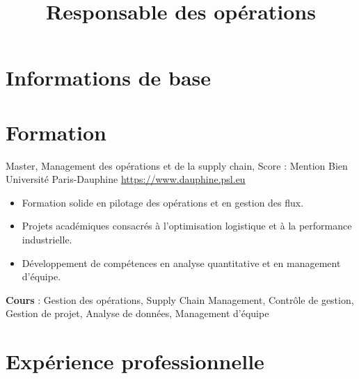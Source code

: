 \documentclass[a4paper, serif, 10pt]{moderncv}
\title{Responsable des opérations}
\begin{document}
\maketitle

\section{Informations de base}

\section{Formation}

        {Master, Management des opérations et de la supply chain, Score : Mention Bien}
        {Université Paris-Dauphine}
        {\url{https://www.dauphine.psl.eu}}
        {}
        {\begin{itemize}
\item Formation solide en pilotage des opérations et en gestion des flux.
\item Projets académiques consacrés à l'optimisation logistique et à la performance industrielle.
\item Développement de compétences en analyse quantitative et en management d'équipe.
\end{itemize}
\textbf{Cours} : Gestion des opérations, Supply Chain Management, Contrôle de gestion, Gestion de projet, Analyse de données, Management d'équipe}
\section{Expérience professionnelle}
\end{document}

